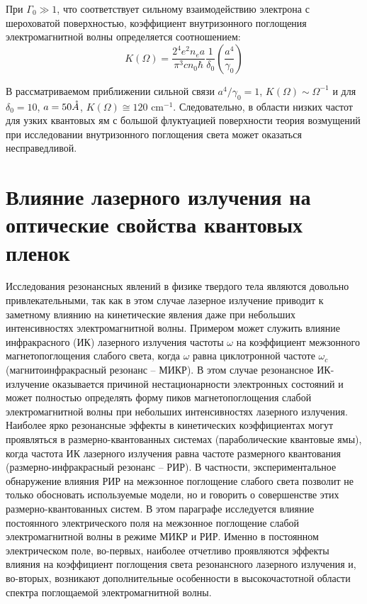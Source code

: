 При $\Gamma _{0} \gg 1$, что соответствует сильному взаимодействию электрона с шероховатой поверхностью, коэффициент внутризонного поглощения электромагнитной волны определяется соотношением:
\begin{equation} \label{eq:21_40}
K(\Omega )=\frac{2^4 e^2 n_e a}{\pi^3 cn_0 \hbar } \frac{1}{\delta_0 } \left(\frac{a^4 }{\gamma_0 } \right)
\end{equation} 

В рассматриваемом приближении сильной связи $a^4 /\gamma_0 =1$, $K(\Omega )\sim \Omega ^{-1} $ и для $\delta_0 =10$, $a=50 \AA$, $K(\Omega )\cong 120 \text{ cm}^{-1} $. Следовательно, в области низких частот для узких квантовых ям с большой флуктуацией поверхности теория возмущений при исследовании внутризонного поглощения света может оказаться несправедливой.
	

\section{Влияние лазерного излучения на оптические свойства квантовых пленок} \label{sect2_2}

Исследования резонансных явлений в физике твердого тела являются довольно привлекательными, так как в этом случае лазерное излучение приводит к заметному влиянию на кинетические явления даже при небольших интенсивностях электромагнитной волны. Примером может служить влияние инфракрасного (ИК) лазерного излучения частоты $\omega $ на коэффициент межзонного магнетопоглощения слабого света, когда $\omega $ равна циклотронной частоте $\omega _{c} $ (магнитоинфракрасный резонанс -- МИКР). В этом случае резонансное ИК-излучение оказывается причиной нестационарности электронных состояний и может полностью определять форму пиков магнетопоглощения слабой электромагнитной волны при небольших интенсивностях лазерного излучения. Наиболее ярко резонансные эффекты в кинетических коэффициентах могут проявляться в размерно-квантованных системах (параболические квантовые ямы), когда частота ИК лазерного излучения равна частоте размерного квантования (размерно-инфракрасный резонанс -- РИР). В частности, экспериментальное обнаружение влияния РИР на межзонное поглощение слабого света позволит не только обосновать используемые модели, но и говорить о совершенстве этих размерно-квантованных систем. В этом параграфе исследуется влияние постоянного электрического поля на межзонное поглощение слабой электромагнитной волны в режиме МИКР и РИР. Именно в постоянном электрическом поле, во-первых, наиболее отчетливо проявляются эффекты влияния на коэффициент поглощения света резонансного лазерного излучения и, во-вторых, возникают дополнительные особенности в высокочастотной области спектра поглощаемой электромагнитной волны.

